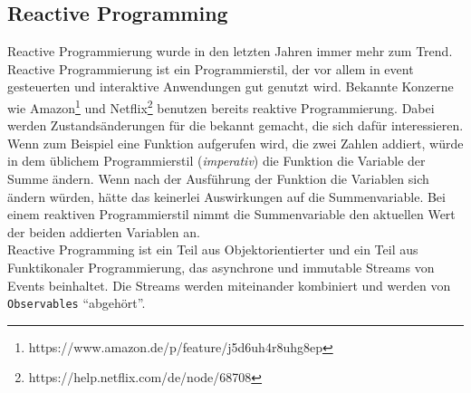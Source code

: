 \subsection{Reactive Programming}
Reactive Programmierung wurde in den letzten Jahren immer mehr zum Trend\cite{Bainomugisha2013}. Reactive Programmierung ist ein Programmierstil, der vor allem in event gesteuerten und interaktive Anwendungen gut genutzt wird. Bekannte Konzerne wie Amazon\footnote{https://www.amazon.de/p/feature/j5d6uh4r8uhg8ep} und Netflix\footnote{https://help.netflix.com/de/node/68708} benutzen bereits reaktive Programmierung. Dabei werden Zustands\"anderungen f\"ur die bekannt gemacht, die sich daf\"ur interessieren. Wenn zum Beispiel eine Funktion aufgerufen wird, die zwei Zahlen addiert, w\"urde in dem \"ublichem Programmierstil (\textit{imperativ}) die Funktion die Variable der Summe \"andern. Wenn nach der Ausf\"uhrung der Funktion die Variablen sich \"andern w\"urden, h\"atte das keinerlei Auswirkungen auf die Summenvariable. Bei einem reaktiven Programmierstil nimmt die Summenvariable den aktuellen Wert der beiden addierten Variablen an\cite{Lambert2016}. \\
Reactive Programming ist ein Teil aus Objektorientierter und ein Teil aus Funktikonaler Programmierung, das asynchrone und immutable Streams von Events beinhaltet. Die Streams werden miteinander kombiniert und werden von \texttt{Observables} \enquote{abgeh\"ort}. 
